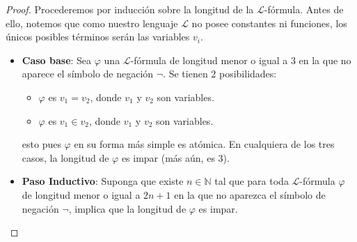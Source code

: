 \documentclass[12pt]{article}
\newcounter{it}
\theoremstyle{largebreak}
\begin{document}
    \begin{proof}
        Procederemos por inducción sobre la longitud de la $\mathcal{L}$-fórmula. Antes de ello, notemos que como nuestro lenguaje $\mathcal{L}$ no posee constantes ni funciones, los únicos posibles términos serán las variables $v_i$. 
        \begin{itemize}
            \item \textbf{Caso base}: Sea $\varphi$ una $\mathcal{L}$-fórmula de longitud menor o igual a 3 en la que no aparece el símbolo de negación $\neg$. Se tienen 2 posibilidades:
            \begin{itemize}
                \item $\varphi$ es $v_1=v_2$, donde $v_1$ y $v_2$ son variables.
                \item $\varphi$ es $v_1\in v_2$, donde $v_1$ y $v_2$ son variables. 
            \end{itemize}
            esto pues $\varphi$ en su forma más simple es atómica. En cualquiera de los tres casos, la longitud de $\varphi$ es impar (más aún, es 3).
            \item \textbf{Paso Inductivo}: Suponga que existe $n\in\mathbb{N}$ tal que para toda $\mathcal{L}$-fórmula $\varphi$ de longitud menor o igual a $2n+1$ en la que no aparezca el símbolo de negación $\neg$, implica que la longitud de $\varphi$ es impar.
            

\end{itemize}
\end{proof}
\end{document}
